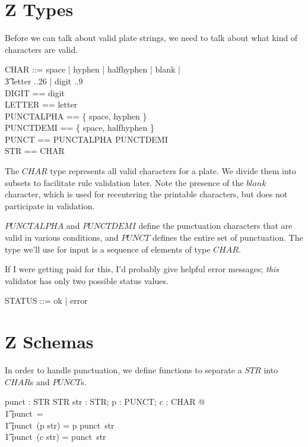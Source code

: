 \documentclass[11pt]{article}
\begin{document}
\section{Z Types}

Before we can talk about valid plate strings, we need to talk about what kind of characters are
valid.  

\begin{zed}
  CHAR  ::= space | hyphen | halfhyphen | blank |           \\
  \t3 letter ..26 \rdata | digit ..9 \rdata \\
  DIGIT == \ran digit                                       \\
  LETTER == \ran letter                                     \\
  PUNCTALPHA == \{ space, hyphen \}                         \\
  PUNCTDEMI == \{ space, halfhyphen \}                      \\
  PUNCT == PUNCTALPHA \cup PUNCTDEMI                        \\
  STR == \seq CHAR
\end{zed}

The $CHAR$ type represents all valid characters for a plate.  We divide them into subsets to
facilitate rule validation later.  Note the presence of the $blank$ character, which is used for
recentering the printable characters, but does not participate in validation.

$PUNCTALPHA$ and $PUNCTDEMI$ define the punctuation characters that are valid in various conditions,
and $PUNCT$ defines the entire set of punctuation.  The type we'll use for input is a sequence of
elements of type $CHAR$.

If I were getting paid for this, I'd probably give helpful error messages; \textit{this} validator
has only two possible status values.

\begin{zed}
  STATUS ::= ok | error
\end{zed}



\section{Z Schemas}

In order to handle punctuation, we define functions to separate a $STR$ into $CHAR$s and
$PUNCT$s.

\begin{axdef}
  punct : STR \fun STR
  \where
  \forall str : STR; p : PUNCT; c : CHAR @                                        \\
  \t1 punct~\langle \rangle = \langle \rangle \land                               \\
  \t1 punct~(\langle p \rangle \cat str) = \langle p \rangle \cat punct~str \land \\
  \t1 punct~(\langle c \rangle \cat str) = punct~str
\end{axdef}
\end{document}
